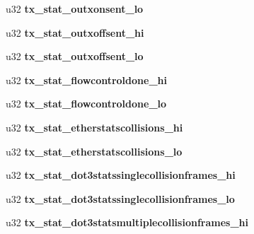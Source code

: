 \begin{DoxyCompactItemize}
\item 
\hypertarget{structbnx2x__eth__stats_a10ce8bbb849df29ab71a1018d894030b}{
u32 {\bfseries tx\_\-stat\_\-outxonsent\_\-lo}}
\label{structbnx2x__eth__stats_a10ce8bbb849df29ab71a1018d894030b}

\item 
\hypertarget{structbnx2x__eth__stats_a179337477bd3c8b3bebd1cac428dfa03}{
u32 {\bfseries tx\_\-stat\_\-outxoffsent\_\-hi}}
\label{structbnx2x__eth__stats_a179337477bd3c8b3bebd1cac428dfa03}

\item 
\hypertarget{structbnx2x__eth__stats_ab78953ae33d552927fd5e99db3684e87}{
u32 {\bfseries tx\_\-stat\_\-outxoffsent\_\-lo}}
\label{structbnx2x__eth__stats_ab78953ae33d552927fd5e99db3684e87}

\item 
\hypertarget{structbnx2x__eth__stats_a3c8b906fb2e41ec085b2a95c0d4322d3}{
u32 {\bfseries tx\_\-stat\_\-flowcontroldone\_\-hi}}
\label{structbnx2x__eth__stats_a3c8b906fb2e41ec085b2a95c0d4322d3}

\item 
\hypertarget{structbnx2x__eth__stats_a8f317ded7d15d7098e889127aeb822ed}{
u32 {\bfseries tx\_\-stat\_\-flowcontroldone\_\-lo}}
\label{structbnx2x__eth__stats_a8f317ded7d15d7098e889127aeb822ed}

\item 
\hypertarget{structbnx2x__eth__stats_a7f6bbd61ae995c22709fab9eafac8f6c}{
u32 {\bfseries tx\_\-stat\_\-etherstatscollisions\_\-hi}}
\label{structbnx2x__eth__stats_a7f6bbd61ae995c22709fab9eafac8f6c}

\item 
\hypertarget{structbnx2x__eth__stats_a152612811caf08e8819e722d13756677}{
u32 {\bfseries tx\_\-stat\_\-etherstatscollisions\_\-lo}}
\label{structbnx2x__eth__stats_a152612811caf08e8819e722d13756677}

\item 
\hypertarget{structbnx2x__eth__stats_a511d2a6d7a2039516bf987b4e6531280}{
u32 {\bfseries tx\_\-stat\_\-dot3statssinglecollisionframes\_\-hi}}
\label{structbnx2x__eth__stats_a511d2a6d7a2039516bf987b4e6531280}

\item 
\hypertarget{structbnx2x__eth__stats_a4b37a257af595fb90756bd6940d64b90}{
u32 {\bfseries tx\_\-stat\_\-dot3statssinglecollisionframes\_\-lo}}
\label{structbnx2x__eth__stats_a4b37a257af595fb90756bd6940d64b90}

\item 
\hypertarget{structbnx2x__eth__stats_a0c8db2d336bcea3a1bdde236bc99edb1}{
u32 {\bfseries tx\_\-stat\_\-dot3statsmultiplecollisionframes\_\-hi}}
\label{structbnx2x__eth__stats_a0c8db2d336bcea3a1bdde236bc99edb1}


\end{DoxyCompactItemize}
